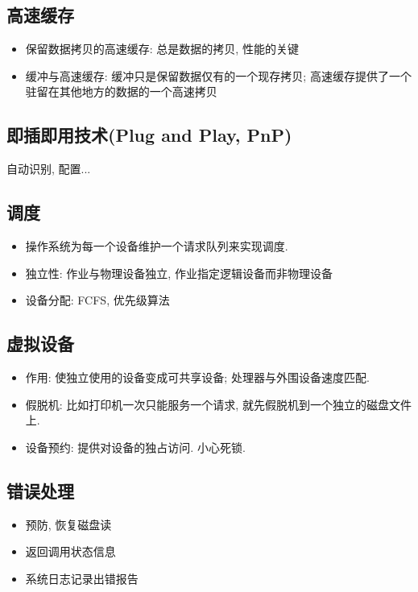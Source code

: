 \documentclass[a4paper, UTF8]{article}
\begin{document}
\subsection{高速缓存}
\begin{itemize}
\item 保留数据拷贝的高速缓存: 总是数据的拷贝, 性能的关键
\item 缓冲与高速缓存: 缓冲只是保留数据仅有的一个现存拷贝; 高速缓存提供了一个驻留在其他地方的数据的一个高速拷贝
\end{itemize}

\subsection{即插即用技术(Plug and Play, PnP)}
自动识别, 配置...

\subsection{调度}
\begin{itemize}
\item 操作系统为每一个设备维护一个请求队列来实现调度.
\item 独立性: 作业与物理设备独立, 作业指定逻辑设备而非物理设备
\item 设备分配: FCFS, 优先级算法
\end{itemize}

\subsection{虚拟设备}
\begin{itemize}
\item 作用: 使独立使用的设备变成可共享设备; 处理器与外围设备速度匹配.
\item 假脱机: 比如打印机一次只能服务一个请求, 就先假脱机到一个独立的磁盘文件上.
\item 设备预约: 提供对设备的独占访问. 小心死锁.
\end{itemize}

\subsection{错误处理}
\begin{itemize}
\item 预防, 恢复磁盘读
\item 返回调用状态信息
\item 系统日志记录出错报告
\end{itemize}
\end{document}
